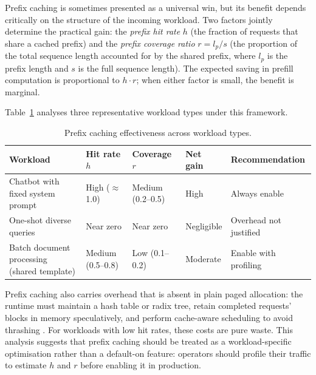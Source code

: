 \documentclass[10pt, a4paper]{article}
\begin{document}
Prefix caching is sometimes presented as a universal win, but its
benefit depends critically on the structure of the incoming workload.
Two factors jointly determine the practical gain: the \emph{prefix
hit rate} $h$ (the fraction of requests that share a cached prefix)
and the \emph{prefix coverage ratio} $r = l_p / s$ (the proportion of
the total sequence length accounted for by the shared prefix, where
$l_p$ is the prefix length and $s$ is the full sequence length).
The expected saving in prefill computation is proportional to $h \cdot r$;
when either factor is small, the benefit is marginal.

Table~\ref{tab:prefix_workload} analyses three representative workload
types under this framework.

\begin{table}[htbp]
    \centering
    \caption{Prefix caching effectiveness across workload types.}
    \label{tab:prefix_workload}
    \begin{tabular}{p{3.2cm} p{2.4cm} p{2.4cm} p{2.4cm} p{2.4cm}}
        \toprule
        \textbf{Workload} & \textbf{Hit rate $h$}
        & \textbf{Coverage $r$} & \textbf{Net gain}
        & \textbf{Recommendation} \\
        \midrule
        Chatbot with fixed system prompt
            & High ($\approx$1.0) & Medium (0.2--0.5)
            & High & Always enable \\
        One-shot diverse queries
            & Near zero & Near zero
            & Negligible & Overhead not justified \\
        Batch document processing (shared template)
            & Medium (0.5--0.8) & Low (0.1--0.2)
            & Moderate & Enable with profiling \\
        \bottomrule
    \end{tabular}
\end{table}

Prefix caching also carries overhead that is absent in plain paged
allocation: the runtime must maintain a hash table or radix tree,
retain completed requests' blocks in memory speculatively, and perform
cache-aware scheduling to avoid thrashing \cite{zheng2024sglang}.
For workloads with low hit rates, these costs are pure waste.
This analysis suggests that prefix caching should be treated as a
workload-specific optimisation rather than a default-on feature:
operators should profile their traffic to estimate $h$ and $r$ before
enabling it in production.

\end{document}
